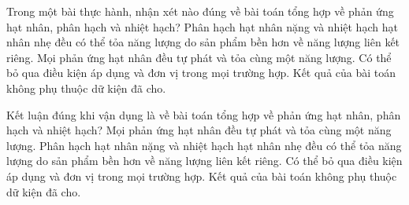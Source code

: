 \begin{ex}
Trong một bài thực hành, nhận xét nào đúng về bài toán tổng hợp về phản ứng hạt nhân, phân hạch và nhiệt hạch?
\choice
{\True Phân hạch hạt nhân nặng và nhiệt hạch hạt nhân nhẹ đều có thể tỏa năng lượng do sản phẩm bền hơn về năng lượng liên kết riêng.}
{Mọi phản ứng hạt nhân đều tự phát và tỏa cùng một năng lượng.}
{Có thể bỏ qua điều kiện áp dụng và đơn vị trong mọi trường hợp.}
{Kết quả của bài toán không phụ thuộc dữ kiện đã cho.}
\end{ex}

\begin{ex}
Kết luận đúng khi vận dụng là về bài toán tổng hợp về phản ứng hạt nhân, phân hạch và nhiệt hạch?
\choice
{Mọi phản ứng hạt nhân đều tự phát và tỏa cùng một năng lượng.}
{\True Phân hạch hạt nhân nặng và nhiệt hạch hạt nhân nhẹ đều có thể tỏa năng lượng do sản phẩm bền hơn về năng lượng liên kết riêng.}
{Có thể bỏ qua điều kiện áp dụng và đơn vị trong mọi trường hợp.}
{Kết quả của bài toán không phụ thuộc dữ kiện đã cho.}
\end{ex}
